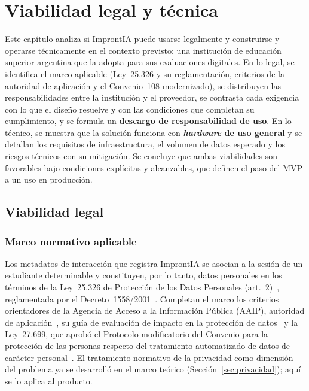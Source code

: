 \chapter{Viabilidad legal y técnica}
\label{ch:viabilidad}

\begin{chapterabstract}
Este capítulo analiza si ImprontIA puede usarse legalmente y construirse y operarse técnicamente en el contexto previsto: una institución de educación superior argentina que la adopta para sus evaluaciones digitales. En lo legal, se identifica el marco aplicable (Ley~25.326 y su reglamentación, criterios de la autoridad de aplicación y el Convenio~108 modernizado), se distribuyen las responsabilidades entre la institución y el proveedor, se contrasta cada exigencia con lo que el diseño resuelve y con las condiciones que completan su cumplimiento, y se formula un \textbf{descargo de responsabilidad de uso}. En lo técnico, se muestra que la solución funciona con \textbf{\textit{hardware} de uso general} y se detallan los requisitos de infraestructura, el volumen de datos esperado y los riesgos técnicos con su mitigación. Se concluye que ambas viabilidades son favorables bajo condiciones explícitas y alcanzables, que definen el paso del MVP a un uso en producción.
\end{chapterabstract}

\section{Viabilidad legal}
\label{sec:viab_legal}

\subsection{Marco normativo aplicable}

Los metadatos de interacción que registra ImprontIA se asocian a la sesión de un estudiante determinable y constituyen, por lo tanto, datos personales en los términos de la Ley~25.326 de Protección de los Datos Personales (art.~2)~\parencite{Argentina2000Ley25326}, reglamentada por el Decreto~1558/2001~\parencite{Argentina2001Dec1558}. Completan el marco los criterios orientadores de la Agencia de Acceso a la Información Pública (AAIP), autoridad de aplicación~\parencite{AAIP2019Res4}, su guía de evaluación de impacto en la protección de datos~\parencite{AAIP2020GuiaEIPD} y la Ley~27.699, que aprobó el Protocolo modificatorio del Convenio para la protección de las personas respecto del tratamiento automatizado de datos de carácter personal~\parencite{Argentina2022Ley27699}. El tratamiento normativo de la privacidad como dimensión del problema ya se desarrolló en el marco teórico (Sección~\ref{sec:privacidad}); aquí se lo aplica al producto.

